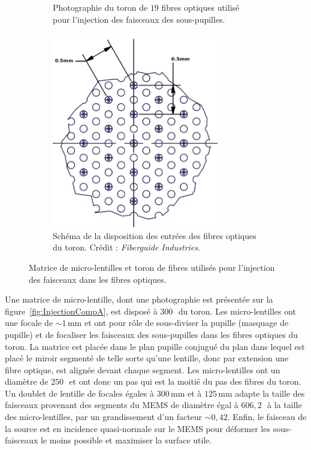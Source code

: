 \begin{figure}[ht!]
\begin{subfigure}[t]{0.5\textwidth}
        \caption{Photographie du toron de $19$ fibres optiques utilisé pour l'injection des faisceaux des sous-pupilles.}
        \label{fig:InjectionCompB}
    \end{subfigure}%
    \begin{subfigure}[t]{0.5\textwidth}
        \centering
        \includegraphics[width=0.8\textwidth]{Figure_Chap2/FiberBundle_Scheme.png}
        \caption{Schéma de la disposition des entrées des fibres optiques du toron. Crédit : \textit{Fiberguide Industries}.}
        \label{fig:InjectionCompC}
    \end{subfigure}
    \caption[Matrice de micro-lentilles et toron de fibres utilisés pour l'injection des faisceaux dans les fibres optiques.]{Matrice de micro-lentilles et toron de fibres utilisés pour l'injection des faisceaux dans les fibres optiques.}
    \label{fig:InjectionComp}
\end{figure}

Une matrice de micro-lentille, dont une photographie est présentée sur la figure~\ref{fig:InjectionCompA}, est disposé à $300 \,$\um~du toron. Les micro-lentilles ont une focale de $\sim 1 \,$mm et ont pour rôle de sous-diviser la pupille (masquage de pupille) et de focaliser les faisceaux des sous-pupilles dans les fibres optiques du toron. La matrice est placée dans le plan pupille conjugué du plan dans lequel est placé le miroir segmenté de telle sorte qu'une lentille, donc par extension une fibre optique, est alignée devant chaque segment. Les micro-lentilles ont un diamètre de $250 \,$\um~et ont donc un pas qui est la moitié du pas des fibres du toron. Un doublet de lentille de focales égales à $300 \,$mm et à $125 \,$mm adapte la taille des faisceaux provenant des segments du \ac{MEMS} de diamètre égal à $606,2 \,$\um~à la taille des micro-lentilles, par un grandissement d'un facteur $\sim 0,42$. Enfin, le faisceau de la source est en incidence quasi-normale sur le \ac{MEMS} pour déformer les sous-faisceaux le moins possible et maximiser la surface utile.


